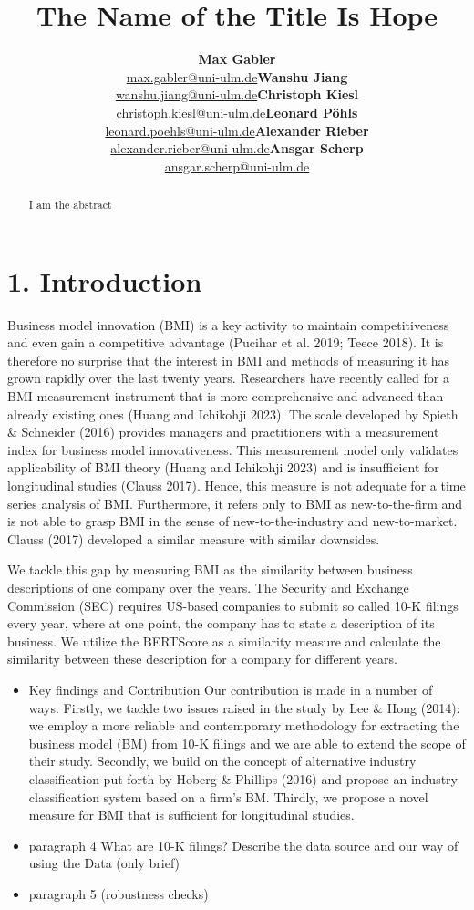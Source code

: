 \documentclass[
]{article}
\title{The Name of the Title Is Hope}
\author{\textbf{Max
Gabler}\\\href{mailto:max.gabler@uni-ulm.de}{max.gabler@uni-ulm.de}\asep\textbf{Wanshu
Jiang}\\\href{mailto:wanshu.jiang@uni-ulm.de}{wanshu.jiang@uni-ulm.de}\asep\textbf{Christoph
Kiesl}\\\href{mailto:christoph.kiesl@uni-ulm.de}{christoph.kiesl@uni-ulm.de}\asep\textbf{Leonard
Pöhls}\\\href{mailto:leonard.poehls@uni-ulm.de}{leonard.poehls@uni-ulm.de}\asep\textbf{Alexander
Rieber}\\\href{mailto:alexander.rieber@uni-ulm.de}{alexander.rieber@uni-ulm.de}\asep\textbf{Ansgar
Scherp}\\\href{mailto:ansgar.scherp@uni-ulm.de}{ansgar.scherp@uni-ulm.de}}
\date{}
\renewcommand*\contentsname{Table of contents}
\newcommand\contentsname{Table of contents}
\begin{document}
\maketitle
\begin{abstract}
I am the abstract
\end{abstract}

\renewcommand*\contentsname{Table of contents}
{
\hypersetup{linkcolor=}
\setcounter{tocdepth}{3}
\tableofcontents
}
\section{1. Introduction}\label{introduction}

Business model innovation (BMI) is a key activity to maintain
competitiveness and even gain a competitive advantage (Pucihar et al.
2019; Teece 2018). It is therefore no surprise that the interest in BMI
and methods of measuring it has grown rapidly over the last twenty
years. Researchers have recently called for a BMI measurement instrument
that is more comprehensive and advanced than already existing ones
(Huang and Ichikohji 2023). The scale developed by Spieth \& Schneider
(2016) provides managers and practitioners with a measurement index for
business model innovativeness. This measurement model only validates
applicability of BMI theory (Huang and Ichikohji 2023) and is
insufficient for longitudinal studies (Clauss 2017). Hence, this measure
is not adequate for a time series analysis of BMI. Furthermore, it
refers only to BMI as new-to-the-firm and is not able to grasp BMI in
the sense of new-to-the-industry and new-to-market. Clauss (2017)
developed a similar measure with similar downsides.

We tackle this gap by measuring BMI as the similarity between business
descriptions of one company over the years. The Security and Exchange
Commission (SEC) requires US-based companies to submit so called 10-K
filings every year, where at one point, the company has to state a
description of its business. We utilize the BERTScore as a similarity
measure and calculate the similarity between these description for a
company for different years.

\begin{itemize}
\item
  Key findings and Contribution Our contribution is made in a number of
  ways. Firstly, we tackle two issues raised in the study by Lee \& Hong
  (2014): we employ a more reliable and contemporary methodology for
  extracting the business model (BM) from 10-K filings and we are able
  to extend the scope of their study. Secondly, we build on the concept
  of alternative industry classification put forth by Hoberg \& Phillips
  (2016) and propose an industry classification system based on a firm's
  BM. Thirdly, we propose a novel measure for BMI that is sufficient for
  longitudinal studies.
\item
  paragraph 4 What are 10-K filings? Describe the data source and our
  way of using the Data (only brief)
\item
  paragraph 5 (robustness checks)
\end{itemize}
\end{document}
